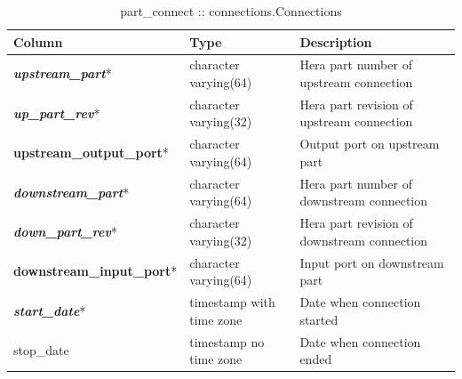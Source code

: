 \documentclass{article}
\begin{document}
\begin{table}[h]
\centering
\caption{part\_connect :: connections.Connections}
\begin{tabular}{| l | l | l |} \hline
{\bf Column} & {\bf Type} & {\bf Description} \\ \hline
{\bf \em upstream\_part}* &  character varying(64) & Hera part number of upstream connection \\ \hline
{\bf \em up\_part\_rev}* & character varying(32) & Hera part revision of upstream connection \\ \hline
{\bf upstream\_output\_port}* & character varying(64) & Output port on upstream part \\ \hline
{\bf \em downstream\_part}* & character varying(64) & Hera part number of downstream connection \\ \hline
{\bf \em down\_part\_rev}* & character varying(32) & Hera part revision of downstream connection \\ \hline
{\bf downstream\_input\_port}* & character varying(64) & Input port on downstream part \\ \hline
{\bf \em start\_date}* & timestamp with time zone & Date when connection started \\ \hline
stop\_date & timestamp no time zone & Date when connection ended \\ \hline
\end{tabular}
\end{table}
\end{document}
